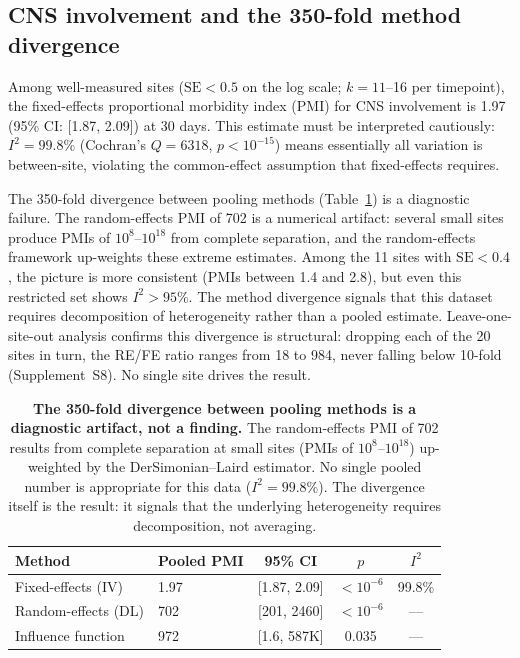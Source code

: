 \documentclass{article}
\begin{document}
\subsection{CNS involvement and the 350-fold method divergence}

Among well-measured sites ($\text{SE} < 0.5$ on the log scale; $k = 11$--16
per timepoint), the fixed-effects proportional morbidity index (PMI) for CNS
involvement is 1.97 (95\% CI: [1.87, 2.09]) at 30 days.  This estimate must
be interpreted cautiously: $I^2 = 99.8\%$ (Cochran's $Q = 6318$, $p <
10^{-15}$) means essentially all variation is between-site, violating the
common-effect assumption that fixed-effects requires.

The 350-fold divergence between pooling methods (Table~\ref{tab:meta}) is a
diagnostic failure.  The random-effects PMI of 702 is a numerical artifact:
several small sites produce PMIs of $10^{8}$--$10^{18}$ from complete
separation, and the random-effects framework up-weights these extreme
estimates.  Among the 11 sites with $\text{SE} < 0.4$, the picture is more
consistent (PMIs between 1.4 and 2.8), but even this restricted set shows
$I^2 > 95\%$.  The method divergence signals that this dataset requires
decomposition of heterogeneity rather than a pooled estimate.
Leave-one-site-out analysis confirms this divergence is structural:
dropping each of the 20 sites in turn, the RE/FE ratio ranges from
18 to 984, never falling below 10-fold (Supplement~S8).  No single
site drives the result.

\begin{table}[t]
\centering
\caption{\textbf{The 350-fold divergence between pooling methods is a
diagnostic artifact, not a finding.}  The random-effects PMI of 702 results
from complete separation at small sites (PMIs of $10^{8}$--$10^{18}$)
up-weighted by the DerSimonian--Laird estimator.  No single pooled number
is appropriate for this data ($I^2 = 99.8\%$).  The divergence itself is
the result: it signals that the underlying heterogeneity requires
decomposition, not averaging.}
\label{tab:meta}
\begin{tabular}{llccc}
\toprule
Method & Pooled PMI & 95\% CI & $p$ & $I^2$ \\
\midrule
Fixed-effects (IV) & 1.97 & [1.87, 2.09] & $< 10^{-6}$ & 99.8\% \\
Random-effects (DL) & 702 & [201, 2460] & $< 10^{-6}$ & --- \\
Influence function & 972 & [1.6, 587K] & 0.035 & --- \\
\bottomrule
\end{tabular}
\end{table}
\end{document}
